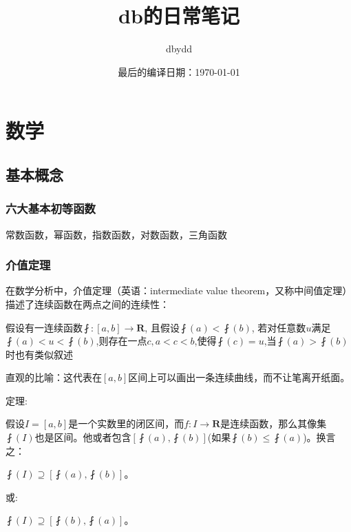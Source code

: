 \documentclass[UTF8]{ctexbook}
\title{db的日常笔记}
\date{最后的编译日期：\today}
\author{dbydd}
\begin{document}
\setcounter{page}{1}
\chapter{数学}{
\section{基本概念}{
\subsection{六大基本初等函数}{
  常数函数，幂函数，指数函数，对数函数，三角函数
}%

\subsection{介值定理}{
在数学分析中，介值定理（英语：intermediate value theorem，又称中间值定理）描述了连续函数在两点之间的连续性：

假设有一连续函数$\fint:[a,b]\rightarrow \mathbf{R}$, 且假设$\fint(a)<\fint(b)$, 若对任意数$u$满足$\fint(a)<u<\fint(b)$,则存在一点$c,a<c<b$,使得$\fint(c) = u$,当$\fint(a)>\fint(b)$时也有类似叙述

直观的比喻：这代表在$[a,b]$区间上可以画出一条连续曲线，而不让笔离开纸面。
\newline

定理:

假设$I = [a,b]$是一个实数里的闭区间，而$f:I\rightarrow\mathbf{R}$是连续函数，那么其像集$\fint(I)$也是区间。他或者包含$[\fint(a),\fint(b)]$(如果$\fint(b)\leq\fint(a)$)。换言之：

$\fint(I)\supseteq[\fint(a),\fint(b)]$。

或:

$\fint(I)\supseteq[\fint(b), \fint(a)]$。

}}}
\end{document}
